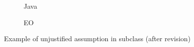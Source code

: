 \begin{figure}
    \centering
    \begin{subfigure}{0.4\textwidth}
        
        \caption{Java}
    \end{subfigure}
    \hfill
    \begin{subfigure}{0.4\textwidth}
        
        \caption{EO}
    \end{subfigure}
    \caption{Example of unjustified assumption in subclass (after revision)}
    \label{fig:unjustified_after}
\end{figure}



\newpage
